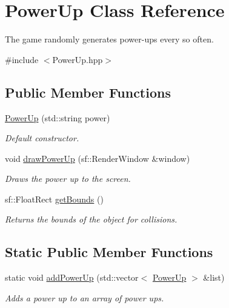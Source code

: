\hypertarget{class_power_up}{}\section{Power\+Up Class Reference}
\label{class_power_up}


The game randomly generates power-\/ups every so often.  




{\ttfamily \#include $<$Power\+Up.\+hpp$>$}

\subsection*{Public Member Functions}
\begin{DoxyCompactItemize}
\item 
\mbox{\label{class_power_up_a3d171ac9e8a335a4c02ae610b527f63d}} 
\hyperlink{class_power_up_a3d171ac9e8a335a4c02ae610b527f63d}{Power\+Up} (std\+::string power)
\begin{DoxyCompactList}\small\item\em Default constructor. \end{DoxyCompactList}\item 
\mbox{\label{class_power_up_a7a2d0ac76554196ffb4ff08dd8720779}} 
void \hyperlink{class_power_up_a7a2d0ac76554196ffb4ff08dd8720779}{draw\+Power\+Up} (sf\+::\+Render\+Window \&window)
\begin{DoxyCompactList}\small\item\em Draws the power up to the screen. \end{DoxyCompactList}\item 
\mbox{\label{class_power_up_ae75a36f6107fa47389689653a6c67056}} 
sf\+::\+Float\+Rect \hyperlink{class_power_up_ae75a36f6107fa47389689653a6c67056}{get\+Bounds} ()
\begin{DoxyCompactList}\small\item\em Returns the bounds of the object for collisions. \end{DoxyCompactList}\end{DoxyCompactItemize}
\subsection*{Static Public Member Functions}
\begin{DoxyCompactItemize}
\item 
\mbox{\label{class_power_up_a41b29527f08816d319744fc34780baac}} 
static void \hyperlink{class_power_up_a41b29527f08816d319744fc34780baac}{add\+Power\+Up} (std\+::vector$<$ \hyperlink{class_power_up}{Power\+Up} $>$ \&list)
\begin{DoxyCompactList}\small\item\em Adds a power up to an array of power ups. \end{DoxyCompactList}\end{DoxyCompactItemize}


